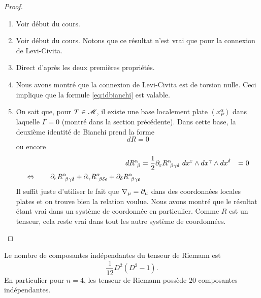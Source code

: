 \documentclass[a4paper,11pt]{report}
\begin{document}
                \begin{proof}${}$\\
                    \begin{enumerate}[label = \textit{\roman*)}]
                        \item Voir début du cours.
                        \item Voir début du cours. Notons que ce résultat n'est vrai que pour la connexion de Levi-Civita.
                        \item Direct d'après les deux premières propriétés.
                        \item Nous avons montré que la connexion de Levi-Civita est de torsion nulle. Ceci implique que la formule \ref{eq:idbianchi} est valable.
                        \item On sait que, pour $T\in\mathscr{M}$, il existe une base localement plate $(x^\alpha_P)$ dans laquelle $\Gamma = 0$ (montré dans la section précédente). Dans cette base, la deuxième identité de Bianchi prend la forme
                        \begin{equation}
                            dR = 0
                        \end{equation}
                        ou encore
                        \begin{align}
                            dR^\alpha_{~\beta} &= \frac{1}{2} \partial_\varepsilon R^\alpha_{~\beta\gamma\delta}~dx^\varepsilon\wedge dx^\gamma\wedge dx^\delta &= 0\\
                            \Leftrightarrow\qquad \partial_\varepsilon R^\alpha_{~\beta\gamma\delta} + \partial_\gamma R^\alpha_{~\beta\delta\epsilon} + \partial_\delta R^\alpha_{~\beta\gamma\varepsilon}
                        \end{align}
                        Il suffit juste d'utiliser le fait que $\nabla_\mu = \partial_\mu$ dans des coordonnées locales plates et on trouve bien la relation voulue. Nous avons montré que le résultat étant vrai dans un système de coordonnée en particulier. Comme $R$ est un tenseur, cela reste vrai dans tout les autre système de coordonnées.
                    \end{enumerate}
                \end{proof}
                
                \begin{prop}\begin{leftbar}
                    Le nombre de composantes indépendantes du tenseur de Riemann est
                    \begin{equation}
                        \frac{1}{12}D^2(D^2-1).
                    \end{equation}
                    En particulier pour $n=4$, les tenseur de Riemann possède $20$ composantes indépendantes.
                \end{leftbar}\end{prop}
                
\end{document}
